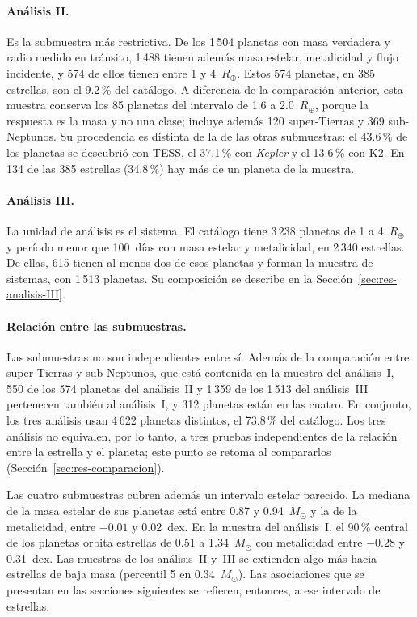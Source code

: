 \paragraph{Análisis II.}
Es la submuestra más restrictiva. De los 1\,504 planetas con masa verdadera y radio medido
en tránsito, 1\,488 tienen además masa estelar, metalicidad y flujo incidente, y 574 de
ellos tienen entre 1 y 4~$R_\oplus$. Estos 574 planetas, en 385 estrellas, son el 9.2\,\%
del catálogo. A diferencia de la comparación anterior, esta muestra conserva los 85
planetas del intervalo de 1.6 a 2.0~$R_\oplus$, porque la respuesta es la masa y no una
clase; incluye además 120 super-Tierras y 369 sub-Neptunos. Su procedencia es distinta de
la de las otras submuestras: el 43.6\,\% de los planetas se descubrió con TESS, el 37.1\,\%
con \textit{Kepler} y el 13.6\,\% con K2. En 134 de las 385 estrellas (34.8\,\%) hay más de
un planeta de la muestra.

\paragraph{Análisis III.}
La unidad de análisis es el sistema. El catálogo tiene 3\,238 planetas de 1 a 4~$R_\oplus$
y período menor que 100~días con masa estelar y metalicidad, en 2\,340 estrellas. De
ellas, 615 tienen al menos dos de esos planetas y forman la muestra de sistemas, con
1\,513 planetas. Su composición se describe en la Sección~\ref{sec:res-analisis-III}.

\paragraph{Relación entre las submuestras.}
Las submuestras no son independientes entre sí. Además de la comparación entre super-Tierras
y sub-Neptunos, que está contenida en la muestra del análisis~I, 550 de los 574 planetas del
análisis~II y 1\,359 de los 1\,513 del análisis~III pertenecen también al análisis~I, y 312
planetas están en las cuatro. En conjunto, los tres análisis usan 4\,622 planetas distintos,
el 73.8\,\% del catálogo. Los tres análisis no equivalen, por lo tanto, a tres pruebas
independientes de la relación entre la estrella y el planeta; este punto se retoma al
compararlos (Sección~\ref{sec:res-comparacion}).

Las cuatro submuestras cubren además un intervalo estelar parecido. La mediana de la masa
estelar de sus planetas está entre 0.87 y 0.94~$M_\odot$ y la de la metalicidad, entre
$-0.01$ y 0.02~dex. En la muestra del análisis~I, el 90\,\% central de los planetas orbita
estrellas de 0.51 a 1.34~$M_\odot$ con metalicidad entre $-0.28$ y 0.31~dex. Las muestras
de los análisis~II y~III se extienden algo más hacia estrellas de baja masa (percentil 5 en
0.34~$M_\odot$). Las asociaciones que se presentan en las secciones siguientes se
refieren, entonces, a ese intervalo de estrellas.

